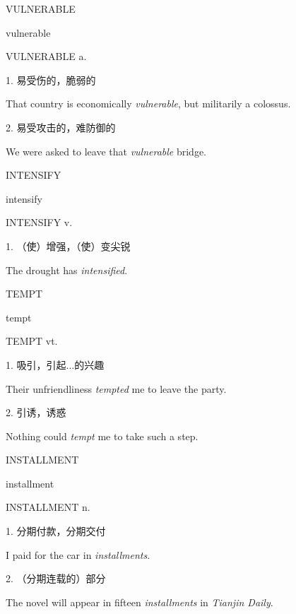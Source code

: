 \begin{flashcard}{
VULNERABLE

vulnerable
}
\begin{center}
VULNERABLE a. 
\end{center}
1. 易受伤的，脆弱的

That country is economically \textit{vulnerable}, but militarily a colossus.

2. 易受攻击的，难防御的

We were asked to leave that \textit{vulnerable} bridge.

\end{flashcard}
\begin{flashcard}{
INTENSIFY

intensify
}
\begin{center}
INTENSIFY v. 
\end{center}
1. （使）增强，（使）变尖锐

The drought has \textit{intensified}.

\end{flashcard}
\begin{flashcard}{
TEMPT

tempt
}
\begin{center}
TEMPT vt. \textipa{[tempt]}
\end{center}
1. 吸引，引起...的兴趣

Their unfriendliness \textit{tempted} me to leave the party.

2. 引诱，诱惑

Nothing could \textit{tempt} me to take such a step.

\end{flashcard}
\begin{flashcard}{
INSTALLMENT

installment
}
\begin{center}
INSTALLMENT n. 
\end{center}
1. 分期付款，分期交付

I paid for the car in \textit{installments}.

2. （分期连载的）部分

The novel will appear in fifteen \textit{installments} in \textit{Tianjin Daily}.

\end{flashcard}
